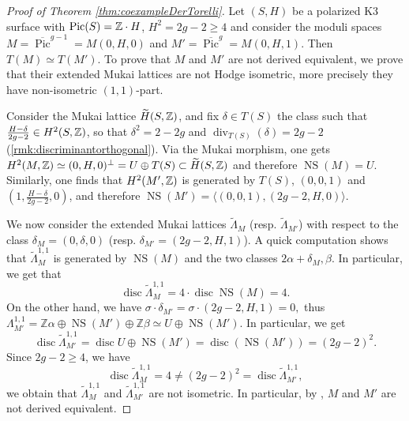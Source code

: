 \documentclass[11pt,twoside]{amsart}
\numberwithin{equation}{section}
\theoremstyle{definition}
\theoremstyle{plain}
\newcommand{\Z}{\ensuremath{\mathbb{Z}}}
\def\NS{\operatorname{NS}}
\def\Pic{\operatorname{Pic}}
\def\olPic{\overline{\operatorname{Pic}}}
\def\disc{\operatorname{disc}}
\def\dv{\operatorname{div}}
\begin{document}
\begin{proof}[Proof of Theorem \ref{thm:coexampleDerTorelli}]
    Let $(S,H)$ be a polarized K3 surface with $\Pic(S)=\bbZ\cdot H$, $H^2=2g-2\geq 4$ and consider the moduli spaces $M=\olPic^{g-1}=M(0,H,0)$ and $M'=\olPic^g=M(0,H,1)$. Then $T(M)\simeq T(M')$. To prove that $M$ and $M'$ are not derived equivalent, we prove that their extended Mukai lattices are not Hodge isometric, more precisely they have non-isometric $(1,1)$-part. 

    Consider the Mukai lattice $\widetilde{H}(S,\mathbb{Z})$, and fix $\delta\in T(S)$ the class such that $\frac{H-\delta}{2g-2}\in H^2(S,\mathbb{Z})$, so that $\delta^2=2-2g$ and $\dv_{T(S)}(\delta)=2g-2$ (\ref{rmk:discriminantorthogonal}).
    Via the Mukai morphism, one gets $H^2(M,\mathbb{Z})\simeq (0,H,0)^\perp=U\oplus T(S)\subset \widetilde{H}(S,\mathbb{Z})$ and therefore $\NS(M)=U$. Similarly, one finds that $H^2(M',\mathbb{Z})$ is generated by $T(S)$, $(0,0,1)$ and $(1,\frac{H-\delta}{2g-2},0)$, and therefore $\NS(M')=\langle (0,0,1),(2g-2,H,0)\rangle$.
    
    We now consider the extended Mukai lattices $\widetilde{\Lambda}_M$ (resp. $\widetilde{\Lambda}_{M'}$) with respect to the class $\delta_M=(0,\delta,0)$ (resp. $\delta_{M'}=(2g-2,H,1)$). A quick computation shows that $\widetilde{\Lambda}_{M}^{1,1}$ is generated by $\NS(M)$ and the two classes $2\alpha+\delta_M, \beta$. In particular, we get that
    $$\disc \widetilde{\Lambda}_{M}^{1,1}=4\cdot \disc \NS(M)=4.$$
    On the other hand, we have $\sigma\cdot \delta_{M'} = \sigma\cdot (2g-2,H,1) = 0,$ thus $\Lambda_{M'}^{1,1} = \Z\alpha\oplus \NS(M')\oplus \Z\beta \simeq U\oplus \NS(M').$ In particular, we get
    $$\disc \widetilde{\Lambda}_{M'}^{1,1}=\disc U\oplus\NS(M')= \disc(\NS(M'))=(2g-2)^2.$$
    Since $2g-2 \geq 4$, we have 
    \[
    \disc \widetilde{\Lambda}_{M}^{1,1} = 4 \neq (2g-2)^2 = \disc \widetilde{\Lambda}_{M'}^{1,1},
    \]
    we obtain that $\widetilde{\Lambda}^{1,1}_{M}$ and $\widetilde{\Lambda}^{1,1}_{M'}$ are not isometric. In particular, by \cite[Theorem 9.2]{Bec22}, $M$ and $M'$ are not derived equivalent.
\end{proof}



\printbibliography
\end{document}
